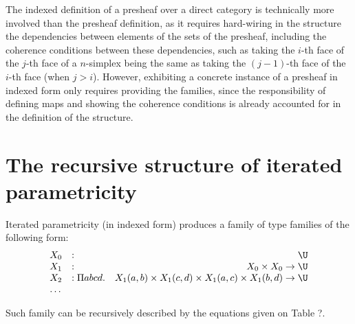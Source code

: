 \documentclass{msc}
\begin{document}
The indexed definition of a presheaf over a direct category is technically more involved than the presheaf definition, as it requires hard-wiring in the structure the dependencies between elements of the sets of the presheaf, including the coherence conditions between these dependencies, such as taking the $i$-th face of the $j$-th face of a $n$-simplex being the same as taking the $(j-1)$-th face of the $i$-th face (when $j>i$). However, exhibiting a concrete instance of a presheaf in indexed form only requires providing the families, since the responsibility of defining maps and showing the coherence conditions is already accounted for in the definition of the structure.

\section{The recursive structure of iterated parametricity}
Iterated parametricity (in indexed form) produces a family of type
families of the following form:
\begin{equation*}
  \begin{array}{llr}
    X_0 & :              & \U                                                                        \\
    X_1 & :              & X_0 \times X_0 \rightarrow  \U                                            \\
    X_2 & : \Pi a b c d. & X_1(a,b) \times X_1 (c,d) \times X_1(a,c) \times X_1 (b,d) \rightarrow \U \\
    \ldots
  \end{array}
\end{equation*}

Such family can be recursively described by the equations given on Table ?.
\end{document}
